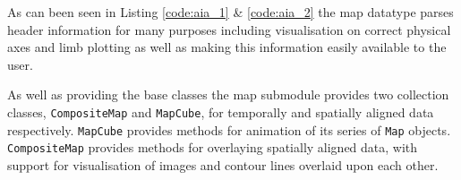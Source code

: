 As can been seen in Listing \ref{code:aia_1} \& \ref{code:aia_2} the map 
datatype parses header information for many purposes including visualisation on 
correct physical axes and limb plotting as well as making this information 
easily available to the user.

As well as providing the base classes the map submodule provides two 
collection classes, \texttt{CompositeMap} and \texttt{MapCube}, for 
temporally and spatially aligned data respectively. \texttt{MapCube} 
provides methods for animation of its series of \texttt{Map} objects. 
\texttt{CompositeMap} provides methods for overlaying spatially aligned 
data, with support for visualisation of images and contour lines overlaid 
upon each other.